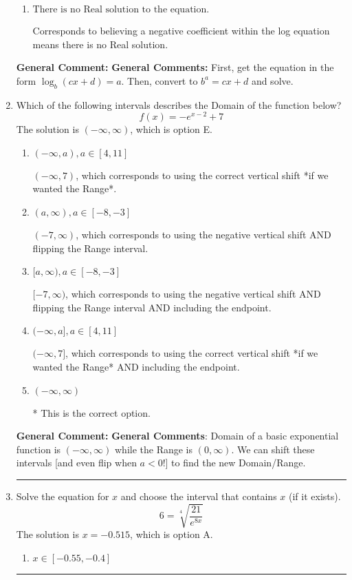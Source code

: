 \documentclass{extbook}[14pt]
\newcommand{\litem}[1]{\item #1

\rule{\textwidth}{0.4pt}}
\begin{document}
\begin{enumerate}
{\begin{enumerate}[label=\Alph*.]
$x = -9.500$, which corresponds to reversing the base and exponent when converting.
\item \( \text{There is no Real solution to the equation.} \)

Corresponds to believing a negative coefficient within the log equation means there is no Real solution.
\end{enumerate}

\textbf{General Comment:} \textbf{General Comments:} First, get the equation in the form $\log_b{(cx+d)} = a$. Then, convert to $b^a = cx+d$ and solve.
}
\litem{
Which of the following intervals describes the Domain of the function below?
\[ f(x) = -e^{x-2}+7 \]The solution is \( (-\infty, \infty) \), which is option E.\begin{enumerate}[label=\Alph*.]
\item \( (-\infty, a), a \in [4, 11] \)

$(-\infty, 7)$, which corresponds to using the correct vertical shift *if we wanted the Range*.
\item \( (a, \infty), a \in [-8, -3] \)

$(-7, \infty)$, which corresponds to using the negative vertical shift AND flipping the Range interval.
\item \( [a, \infty), a \in [-8, -3] \)

$[-7, \infty)$, which corresponds to using the negative vertical shift AND flipping the Range interval AND including the endpoint.
\item \( (-\infty, a], a \in [4, 11] \)

$(-\infty, 7]$, which corresponds to using the correct vertical shift *if we wanted the Range* AND including the endpoint.
\item \( (-\infty, \infty) \)

* This is the correct option.
\end{enumerate}

\textbf{General Comment:} \textbf{General Comments}: Domain of a basic exponential function is $(-\infty, \infty)$ while the Range is $(0, \infty)$. We can shift these intervals [and even flip when $a<0$!] to find the new Domain/Range.
}
\litem{
 Solve the equation for $x$ and choose the interval that contains $x$ (if it exists).
\[  6 = \sqrt[4]{\frac{21}{e^{8x}}} \]The solution is \( x = -0.515 \), which is option A.\begin{enumerate}[label=\Alph*.]
\item \( x \in [-0.55, -0.4] \)


\end{enumerate}}
\end{enumerate}
\end{document}
